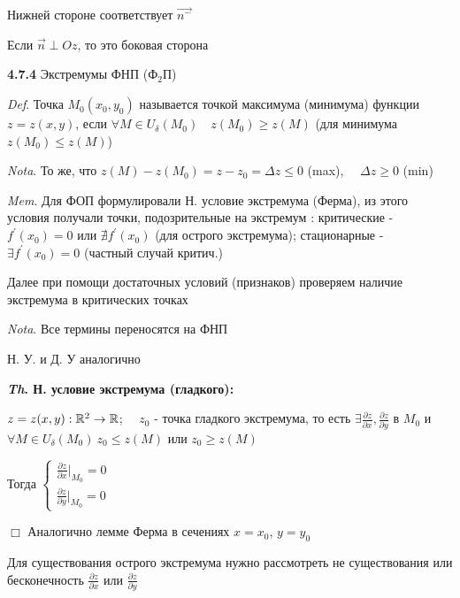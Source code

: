 \documentclass[12pt]{article}
\begin{document}
    Нижней стороне соответствует $\overrightarrow{n^-}$

    Если $\overrightarrow{n} \perp Oz$, то это боковая сторона

    \vspace{10mm}

    \textbf{4.7.4} Экстремумы ФНП (Ф$_2$П)

    \vspace{3mm}
\textit{Def}. Точка $M_0(x_0, y_0)$ называется точкой максимума (минимума) функции $z = z(x, y)$, если $\forall M \in U_\delta (M_0) \quad z(M_0) \geq z(M)$ (для минимума $z(M_0) \leq z(M)$)

    \vspace{3mm}
\textit{Nota}. То же, что $z(M) - z(M_0) = z - z_0 = \Delta z \leq 0$ (max), $\quad \Delta z \geq 0$ (min)

    \vspace{3mm}
\textit{Mem}. Для ФОП формулировали Н. условие экстремума (Ферма), из этого условия получали точки, подозрительные на экстремум : критические - $f^\prime(x_0) = 0$ или $\nexists f^\prime(x_0)$ (для острого экстремума); стационарные - $\exists f^\prime(x_0) = 0$ (частный случай критич.)

    Далее при помощи достаточных условий (признаков) проверяем наличие экстремума в критических точках

    \vspace{3mm}
\textit{Nota}. Все термины переносятся на ФНП

    Н. У. и Д. У аналогично

    \vspace{5mm}
    \textbf{
    \vspace{3mm}
\textit{Th}. Н. условие экстремума (гладкого):}

    $z = z(x, y) : \mathbb{R}^2 \rightarrow \mathbb{R}$; $\quad z_0$ - точка гладкого экстремума,
    то есть $\displaystyle \exists \frac{\partial z}{\partial x}, \frac{\partial z}{\partial y}$ в $M_0$ и $\forall M \in U_\delta(M_0) \ z_0 \leq z(M)$ или $z_0 \geq z(M)$

    Тогда $\displaystyle \begin{cases}\frac{\partial z}{\partial x} |_{M_0} = 0 \\ \frac{\partial z}{\partial y} |_{M_0} = 0\end{cases}$

    $\Box$ Аналогично лемме Ферма в сечениях $x = x_0$, $y = y_0$

    Для существования острого экстремума нужно рассмотреть не существования или бесконечность $\displaystyle \frac{\partial z}{\partial x}$ или $\displaystyle \frac{\partial z}{\partial y}$
\end{document}
